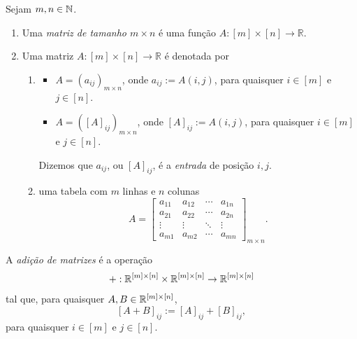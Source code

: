 \begin{definition}
    Sejam $m,n \in \mathbb{N}$.
        \leavevmode
            \begin{enumerate}[leftmargin=*, align=left, label=\textbf{(\alph*)}]
                \item Uma \emph{matriz de tamanho $m \times n$} é uma função $A : [m] \times [n] \to \mathbb{R}$.
                \item Uma matriz $A : [m] \times [n] \to \mathbb{R}$ é denotada por 
                    \begin{enumerate}[label=\roman*.]
                        \item 
                            \begin{itemize}
                                \item $A = (a_{ij})_{m \times n}$, onde $a_{ij} := A(i,j)$, para quaisquer $i \in [m]$ e $j \in [n]$.
                                \item $A = ([A]_{ij})_{m \times n}$, onde $[A]_{ij} := A(i,j)$, para quaisquer $i \in [m]$ e $j \in [n]$.
                            \end{itemize}
                         Dizemos que $a_{ij}$, ou $[A]_{ij}$, é a \emph{entrada} de posição $i, j$.
                        \item uma tabela com $m$ linhas e $n$ colunas
                            \[
                                A =
                                    \begin{bmatrix}
                                        a_{11} & a_{12} & \cdots & a_{1n} \\
                                        a_{21} & a_{22} & \cdots & a_{2n} \\
                                        \vdots & \vdots & \ddots &  \vdots \\
                                        a_{m1} & a_{m2} & \cdots & a_{mn}
                                    \end{bmatrix}_{m \times n}.
                            \]
                    \end{enumerate}
            \end{enumerate}
\end{definition}

\begin{definition}
    A \emph{adição de matrizes} é a operação
        \[
            + : \mathbb{R}^{[m] \times [n]} \times \mathbb{R}^{[m] \times [n]} \to \mathbb{R}^{[m] \times [n]}
        \]
    tal que, para quaisquer $A, B \in \mathbb{R}^{[m] \times [n]}$,
        \[
            [A+B]_{ij} := [A]_{ij} + [B]_{ij},
        \]
    para quaisquer $i \in [m]$ e $j \in [n]$.
\end{definition}

